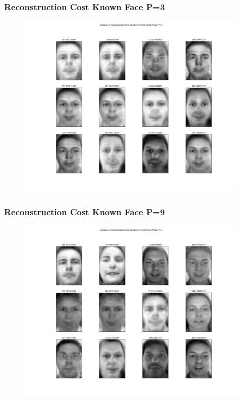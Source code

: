 \documentclass[11pt]{beamer}
\begin{document}
\begin{frame}
\frametitle{Reconstruction Cost Known Face P=3}
\begin{figure}
\includegraphics[width=.95\textwidth]{reconstruction_cost_3.png}
\end{figure}
\end{frame}

\begin{frame}
\frametitle{Reconstruction Cost Known Face P=9}
\begin{figure}
\includegraphics[width=.95\textwidth]{reconstruction_cost_9.png}
\end{figure}
\end{frame}
\end{document}

